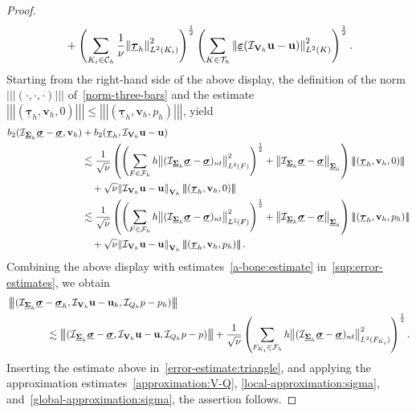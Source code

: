 \documentclass[a4paper,twoside,10pt]{article}
\theoremstyle{plain}
\theoremstyle{remark}
\theoremstyle{definition}
\numberwithin{equation}{section}
\numberwithin{figure}{section}
\newcommand{\Norm}[1]{{\left\|{#1} \right\|}}
\newcommand{\Normthreebars}[3]{\left|\!\left|\!\left| (#1,#2,#3) \right|\!\right|\!\right|}
\newcommand{\Ccalh}{\mathcal{C}_h}
\newcommand{\Tauh}{\mathcal{T}_h}
\newcommand{\K}{K}
\newcommand{\F}{F}
\newcommand{\Sigmah}{\underline{\boldsymbol{\Sigma}}_h}
\newcommand{\Vh}{{\bf{V}}_h}
\newcommand{\Qh}{Q_h}
\newcommand{\taubfh}{\underline{\boldsymbol{\tau}}_h}
\newcommand{\vbfh}{\mathbf{v}_h}
\newcommand{\sigmabfh}{\underline{\boldsymbol{\sigma}}_h}
\newcommand{\ubfh}{\mathbf{u}_h}
\newcommand{\ph}{p_h}
\newcommand{\sigmabf}{\underline{\boldsymbol{\sigma}}}
\newcommand{\ubf}{\mathbf{u}}
\newcommand{\normtang}{{nt}}
\newcommand{\Ltwo}{L^2}
\newcommand{\Fcalh}{\mathcal{F}_h}
\newcommand{\btwo}{b_2}
\newcommand{\epsbfun}{\underline{\boldsymbol{\varepsilon}}}
\newcommand{\Ki}{{\K_i}}
\newcommand{\Fi}{{\F_{\Ki}}}
\newcommand{\IcalQhkmo}{\mathcal{I}_{\Qh}}
\newcommand{\IcalVhk}{\mathcal{I}_{\Vh}}
\newcommand{\IcalSigmahkmo}{\mathcal{I}_{\Sigmah}}
\begin{document}
\begin{proof}
\begin{equation*}
\begin{split}
    &\quad+ \left(\sum_{\Ki \in \Ccalh} \frac{1}{\nu}\Norm{\taubfh}^2_{\Ltwo(\Ki)}\right)^{\frac12}
             \left(\sum_{\K \in \Tauh}\Norm{\epsbfun(\IcalVhk\ubf - \ubf)}^2_{\Ltwo(\K)}\right)^{\frac12}.
\end{split}
\end{equation*}
Starting from the right-hand side of the above display,
the definition of the norm~$\Normthreebars{\cdot}{\cdot}{\cdot}$ of~\eqref{norm-three-bars}
and the estimate
$\Normthreebars{\taubfh}{\vbfh}{0} \leq \Normthreebars{\taubfh}{\vbfh}{\ph}$,
yield
\begin{equation*}
\begin{split}
\btwo(\IcalSigmahkmo\sigmabf - \sigmabf,\vbfh) &+ \btwo(\taubfh,\IcalVhk\ubf - \ubf) \\
&\lesssim \frac{1}{\sqrt{\nu}}\left(\left(\sum_{\F \in \Fcalh} {h}\Norm{(\IcalSigmahkmo\sigmabf - \sigmabf)_{\normtang}}^2_{\Ltwo(\F)}\right)^{\frac12}
                +\Norm{\IcalSigmahkmo\sigmabf - \sigmabf}_{\Sigmah} \right)
                \Normthreebars{\taubfh}{\vbfh}{0} \\
    &\quad+ \sqrt{\nu}\Norm{\IcalVhk\ubf - \ubf}_{\Vh} 
                \Normthreebars{\taubfh}{\vbfh}{0} \\
&\lesssim \frac{1}{\sqrt{\nu}}\left(\left(\sum_{\F \in \Fcalh} {h}\Norm{(\IcalSigmahkmo\sigmabf - \sigmabf)_{\normtang}}^2_{\Ltwo(\F)}\right)^{\frac12}
                +\Norm{\IcalSigmahkmo\sigmabf - \sigmabf}_{\Sigmah} \right)
                \Normthreebars{\taubfh}{\vbfh}{\ph} \\
    &\quad+ \sqrt{\nu}\Norm{\IcalVhk\ubf - \ubf}_{\Vh} 
                \Normthreebars{\taubfh}{\vbfh}{\ph}.
\end{split}
\end{equation*}
Combining the above display with estimates~\eqref{a-bone:estimate} in~\eqref{sup:error-estimates},
we obtain
\begin{equation*}
\begin{split}
&\Normthreebars{\IcalSigmahkmo\sigmabf - \sigmabfh}{\IcalVhk\ubf - \ubfh}{\IcalQhkmo p - \ph} \\
&\qquad\qquad\lesssim \Normthreebars{\IcalSigmahkmo\sigmabf - \sigmabf}{\IcalVhk\ubf - \ubf}{\IcalQhkmo p - p}
    + \frac{1}{\sqrt{\nu}}\left(\sum_{\Fi \in \Fcalh} {h}\Norm{(\IcalSigmahkmo\sigmabf - \sigmabf)_{\normtang}}^2_{\Ltwo(\Fi)}\right)^{\frac12}.
\end{split}
\end{equation*}
Inserting the estimate above in~\eqref{error-estimate:triangle},
and applying the approximation
estimates~\eqref{approximation:V-Q}, \eqref{local-approximation:sigma}, and~\eqref{global-approximation:sigma},
the assertion follows.
\end{proof}
\end{document}
